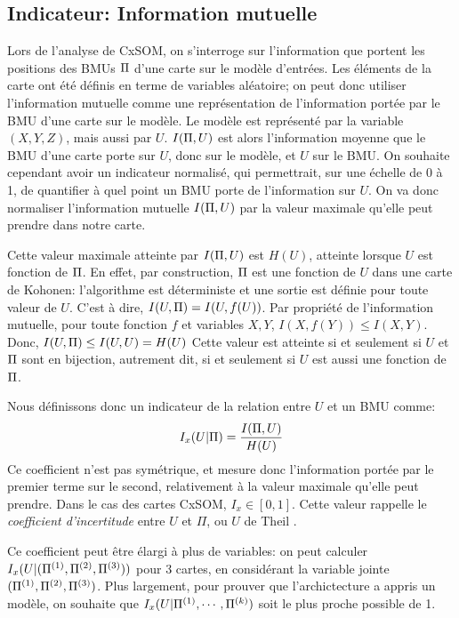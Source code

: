 \subsection{Indicateur: Information mutuelle}

Lors de l'analyse de CxSOM, on s'interroge sur l'information que portent les positions des BMUs $\Pi$ d'une carte sur le modèle d'entrées. Les éléments de la carte ont été définis en terme de variables aléatoire; on peut donc utiliser l'information mutuelle comme une représentation de l'information portée par le BMU d'une carte sur le modèle. Le modèle est représenté par la variable $(X,Y,Z)$, mais aussi par $U$. $I(\Pi, U)$ est alors l'information moyenne que le BMU d'une carte porte sur $U$, donc sur le modèle, et $U$ sur le BMU. On souhaite cependant avoir un indicateur normalisé, qui permettrait, sur une échelle de 0 à 1, de quantifier à quel point un BMU porte de l'information sur $U$. On va donc normaliser l'information mutuelle $I(\Pi,U)$ par la valeur maximale qu'elle peut prendre dans notre carte.


Cette valeur maximale atteinte par $I(\Pi,U)$ est $H(U)$, atteinte lorsque $U$ est fonction de $\Pi$.
En effet, par construction, $\Pi$ est une fonction de $U$ dans une carte de Kohonen: l'algorithme est déterministe et une sortie est définie pour toute valeur de $U$. C'est à dire, $I(U,\Pi) = I (U, f(U))$.
Par propriété de l'information mutuelle, pour toute fonction $f$ et variables $X,Y$, $I(X,f(Y)) \leq I(X,Y) $. 
Donc, $I(U,\Pi) \leq I(U,U) = H(U)$
Cette valeur est atteinte si et seulement si $U$ et $\Pi$ sont en bijection, autrement dit, si et seulement si $U$ est aussi une fonction de $\Pi$.


Nous définissons donc un indicateur de la relation entre $U$ et un BMU comme:
\begin{equation}
I_x(U|\Pi) = \frac{I(\Pi,U)}{H(U)}
\end{equation}
Ce coefficient n'est pas symétrique, et mesure donc l'information portée par le premier terme sur le second, relativement à la valeur maximale qu'elle peut prendre. Dans le cas des cartes CxSOM, $I_x \in [0,1]$. Cette valeur rappelle le \emph{coefficient d'incertitude} entre $U$ et $\Pi$, ou $U$ de Theil \cite{Theil1961EconomicFA}.


Ce coefficient peut être élargi à plus de variables: on peut calculer $I_x(U | (\Pi^{({1})},\Pi^{({2})},\Pi^{({3})}))$ pour 3 cartes, en considérant la variable jointe $(\Pi^{({1})},\Pi^{({2})},\Pi^{({3})})$.
Plus largement, pour prouver que l'archictecture a appris un modèle, on souhaite que $I_x(U|\Pi^{({1})},\cdots,\Pi^{({k})})$ soit le plus proche possible de 1.

